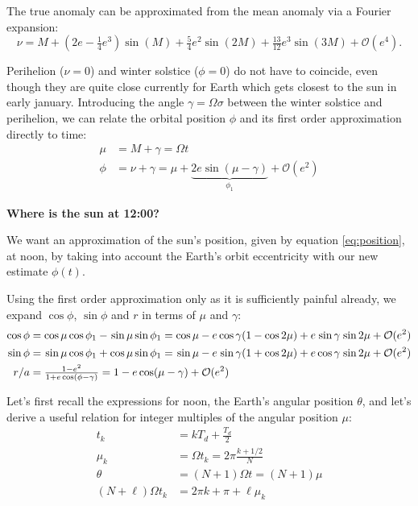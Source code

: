 \documentclass[12pt]{article}
\newcommand{\Sin}{%
  \mathop{\sbox0{$\cos$}\makebox[\wd0][r]{$\sin$}}%
}
\begin{document}
The true anomaly can be approximated from the mean anomaly
via a Fourier expansion:
\begin{equation}
    \nu = M + (2e - \tfrac{1}{4}e^3)\sin(M) + \tfrac{5}{4}e^2 \sin(2M) + 
    \tfrac{13}{12}e^3 \sin(3M) + \mathcal{O}(e^4).
\end{equation}

Perihelion ($\nu=0$) and winter solstice ($\phi=0$) do not have to coincide,
even though they are quite close currently for Earth which gets closest to the 
sun in early january. Introducing the angle $\gamma=\Omega\sigma$ between the 
winter solstice and perihelion, we can relate the orbital position $\phi$ and 
its first order approximation directly to time:
\begin{equation}
    \begin{aligned}
        \mu &= M + \gamma = \Omega t\\
        \phi &= \nu + \gamma = \mu + \underbrace{2e \sin(\mu-\gamma)}_{\phi_1} + \mathcal{O}(e^2)
    \end{aligned}
\end{equation}

\textbf{Where is the sun at 12:00?}

We want an approximation of the sun's position, given by equation 
\eqref{eq:position}, at noon, by taking into account the
Earth's orbit eccentricity with our new estimate $\phi(t)$.

Using the first order approximation only as it is
sufficiently painful already, we expand $\cos\phi$, 
$\sin\phi$ and $r$ in terms of $\mu$ and $\gamma$:
\begin{equation}
    \begin{aligned}
        \cos \phi &= \cos \mu \cos\phi_1 - \Sin \mu \sin\phi_1 = 
            \cos\mu -e\cos\gamma(1-\cos2\mu) + e\Sin\gamma\Sin2\mu + \mathcal{O}(e^2)\\
        \sin \phi &= \Sin \mu \cos\phi_1 + \cos \mu \sin\phi_1 = 
            \Sin\mu -e\Sin\gamma(1+\cos2\mu) + e\cos\gamma\Sin2\mu + \mathcal{O}(e^2)\\
        r/a &= \tfrac{1-e^2}{1+e\cos(\phi-\gamma)} 
            = 1 - e\cos(\mu-\gamma) + \mathcal{O}(e^2) 
    \end{aligned}
\end{equation}

Let's first recall the expressions for noon, the Earth's angular position 
$\theta$, and let's derive a useful relation for integer multiples of the 
angular position $\mu$:
\begin{align}
    t_k &= k T_d + \tfrac{T_d}{2}\\
    \mu_k &= \Omega t_k = 2\pi \tfrac{k+1/2}{N}\\
    \theta &= (N+1)\Omega t = (N+1)\mu\\
    (N+\ell)\Omega t_{k} &= 2\pi k + \pi + \ell \mu_k
\end{align}
\end{document}
